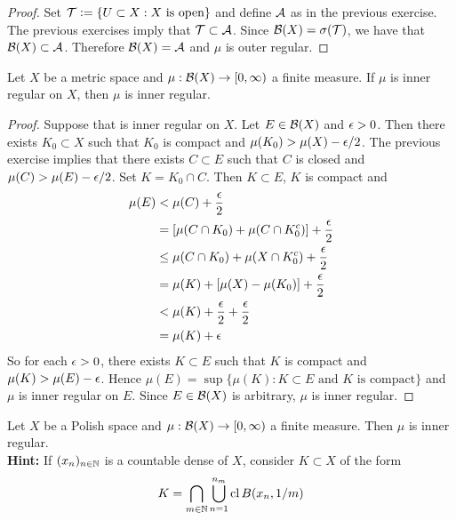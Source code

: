 \documentclass{book}
\begin{document}
	\begin{proof}
		Set $\mathcal{T} \vcentcolon= \{U \subset X: X \text{ is open}\}$ and define $\mathcal{A}$ as in the previous exercise. The previous exercises imply that $\mathcal{T} \subset \mathcal{A}$. Since $\mathcal{B}(X) = \sigma(\mathcal{T})$, we have that $\mathcal{B}(X) \subset \mathcal{A}$. Therefore $\mathcal{B}(X) = \mathcal{A}$ and $\mu$ is outer regular.  
	\end{proof}

	\begin{ex}
		Let $X$ be a metric space and $\mu: \mathcal{B}(X) \rightarrow [0, \infty)$ a finite measure. If $\mu$ is inner regular on $X$, then $\mu$ is inner regular.
	\end{ex}

	\begin{proof}
		Suppose that is inner regular on $X$. Let $E \in \mathcal{B}(X)$ and $\epsilon >0$. Then there exists $K_0 \subset X$ such that $K_0$ is compact and $\mu(K_0) > \mu(X) - \epsilon/2$. The previous exercise implies that there exists $C \subset E$ such that $C$ is closed and $\mu(C) > \mu(E) - \epsilon/2$. Set $K = K_0 \cap C$. Then $K \subset E$, $K$ is compact and 
		\begin{align*}
			\mu(E)
			& < \mu(C) + \frac{\epsilon}{2} \\
			& =[ \mu(C \cap K_0) + \mu(C \cap K_0^c)] + \frac{\epsilon}{2} \\
			& \leq \mu(C \cap K_0) + \mu(X \cap K_0^c) + \frac{\epsilon}{2} \\
			&= \mu(K) + [\mu(X) - \mu(K_0)] + \frac{\epsilon}{2} \\
			&< \mu(K) + \frac{\epsilon}{2} + \frac{\epsilon}{2} \\
			&= \mu(K) + \epsilon
		\end{align*}
		So for each $\epsilon >0$, there exists $K \subset E$ such that $K$ is compact and $\mu(K) > \mu(E) - \epsilon$. Hence $\mu(E) = \sup\{\mu(K): K \subset E \text{ and  $K$ is compact}\}$ and $\mu$ is inner regular on $E$. Since $E \in \mathcal{B}(X)$ is arbitrary, $\mu$ is inner regular.
	\end{proof}

	\begin{ex}
		Let $X$ be a Polish space and $\mu: \mathcal{B}(X) \rightarrow [0, \infty)$ a finite measure. Then $\mu$ is inner regular. \\
		\textbf{Hint:} If $(x_{n})_{n \in \mathbb{N}}$ is a countable dense of $X$, consider $K \subset X$ of the form 
		$$K = \bigcap\limits_{m \in \mathbb{N}} \bigcup\limits_{n = 1}^{n_m} \operatorname{cl} B(x_n, 1/m) $$
	\end{ex}
\end{document}
